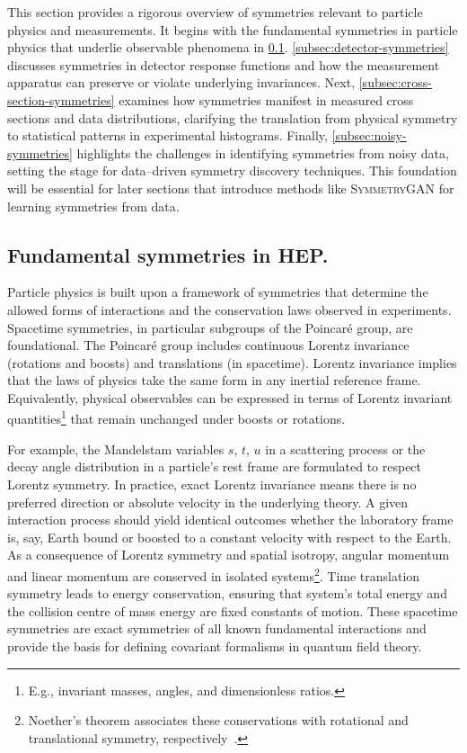     This section provides a rigorous overview of symmetries relevant to particle physics and measurements.
    It begins with the fundamental symmetries in particle physics that underlie observable phenomena in \cref{subsec:hep-symmetries}.
    \cref{subsec:detector-symmetries} discusses symmetries in detector response functions and how the measurement apparatus can preserve or violate underlying invariances.
    Next, \cref{subsec:cross-section-symmetries} examines how symmetries manifest in measured cross sections and data distributions, clarifying the translation from physical symmetry to statistical patterns in experimental histograms.
    Finally, \cref{subsec:noisy-symmetries} highlights the challenges in identifying symmetries from noisy data, setting the stage for data--driven symmetry discovery techniques.
    This foundation will be essential for later sections that introduce methods like \textsc{SymmetryGAN} for learning symmetries from data.

    \subsection{Fundamental symmetries in HEP.}
    \label{subsec:hep-symmetries}
        Particle physics is built upon a framework of symmetries that determine the allowed forms of interactions and the conservation laws observed in experiments.
        Spacetime symmetries, in particular subgroups of the Poincar\'e group, are foundational.
        The Poincar\'e group includes continuous Lorentz invariance (rotations and boosts) and translations (in spacetime).
        Lorentz invariance implies that the laws of physics take the same form in any inertial reference frame.
        Equivalently, physical observables can be expressed in terms of Lorentz invariant quantities\footnote{E.g., invariant masses, angles, and dimensionless ratios.} that remain unchanged under boosts or rotations.
        
        For example, the Mandelstam variables $s$, $t$, $u$ in a scattering process or the decay angle distribution in a particle's rest frame are formulated to respect Lorentz symmetry.
        In practice, exact Lorentz invariance means there is no preferred direction or absolute velocity in the underlying theory.
        A given interaction process should yield identical outcomes whether the laboratory frame is, say, Earth bound or boosted to a constant velocity with respect to the Earth.
        As a consequence of Lorentz symmetry and spatial isotropy, angular momentum and linear momentum are conserved in isolated systems\footnote{Noether’s theorem associates these conservations with rotational and translational symmetry, respectively~\cite{noauthor_nachrichten_nodate}.}.
        Time translation symmetry leads to energy conservation, ensuring that system's total energy and the collision centre of mass energy are fixed constants of motion.
        These spacetime symmetries are exact symmetries of all known fundamental interactions and provide the basis for defining covariant formalisms in quantum field theory.

